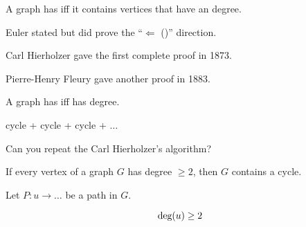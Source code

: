 \begin{frame}{}
  \begin{theorem}
    A graph has  iff
    it contains  vertices that have an  degree.
  \end{theorem}

  \pause
  \vspace{0.60cm}
  \begin{center}
    Euler stated but did 
    prove the ``$\Longleftarrow$ ({\it {}})'' direction.

    \pause
    \vspace{0.60cm}
    Carl Hierholzer  gave the first complete proof in 1873.

    \pause
    \vspace{0.60cm}
    Pierre-Henry Fleury gave another proof in 1883.
  \end{center}
\end{frame}

\begin{frame}{}
  \begin{theorem}
    A  graph has  iff
     has  degree.
    \begin{center}
    \end{center}
  \end{theorem}

  \pause
  \vspace{0.30cm}
  \begin{center}
    cycle + cycle + cycle + $\dots$
  \end{center}
\end{frame}

\begin{frame}{}
  \begin{center}
    Can you repeat the Carl Hierholzer's algorithm?
  \end{center}
\end{frame}

\begin{frame}{}
  \begin{lemma}
    If every vertex of a graph $G$ has degree $\ge 2$,
    then $G$ contains a cycle.
  \end{lemma}

  \pause
  \vspace{0.30cm}
  \begin{center}
    \pause
    \vspace{0.50cm}

    Let $P: u \to \dots$ be a  path in $G$.

    \pause
    \[
      \text{deg}(u) \ge 2
    \]
  \end{center}
\end{frame}

